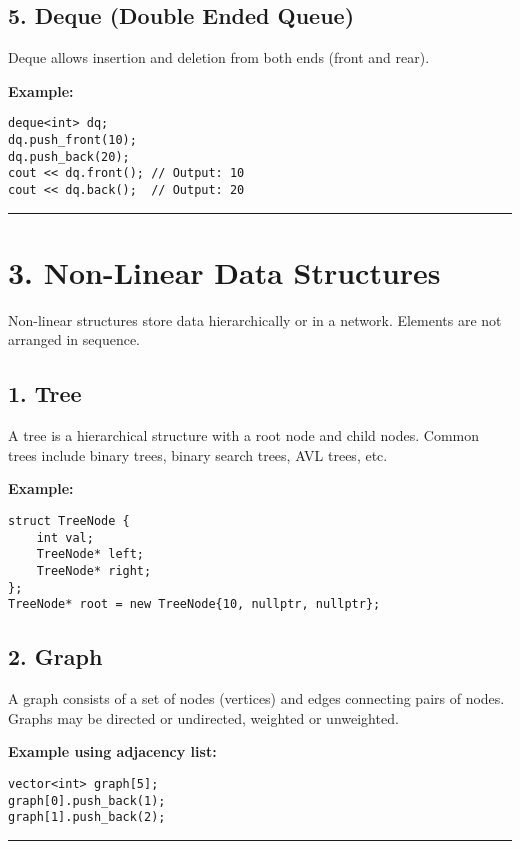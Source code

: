 \subsection*{\textbf{5. Deque (Double Ended Queue)}}
Deque allows insertion and deletion from both ends (front and rear).

\textbf{Example:}
\begin{lstlisting}
deque<int> dq;
dq.push_front(10);
dq.push_back(20);
cout << dq.front(); // Output: 10
cout << dq.back();  // Output: 20
\end{lstlisting}

\vspace{0.5cm}
\hrule
\vspace{0.5cm}

\section*{\Large \textbf{3. Non-Linear Data Structures}}

Non-linear structures store data hierarchically or in a network. Elements are not arranged in sequence.

\subsection*{\textbf{1. Tree}}
A tree is a hierarchical structure with a root node and child nodes. Common trees include binary trees, binary search trees, AVL trees, etc.

\textbf{Example:}
\begin{lstlisting}
struct TreeNode {
    int val;
    TreeNode* left;
    TreeNode* right;
};
TreeNode* root = new TreeNode{10, nullptr, nullptr};
\end{lstlisting}

\subsection*{\textbf{2. Graph}}
A graph consists of a set of nodes (vertices) and edges connecting pairs of nodes. Graphs may be directed or undirected, weighted or unweighted.

\textbf{Example using adjacency list:}
\begin{lstlisting}
vector<int> graph[5];
graph[0].push_back(1);
graph[1].push_back(2);
\end{lstlisting}

\vspace{0.5cm}
\hrule
\vspace{0.5cm}

